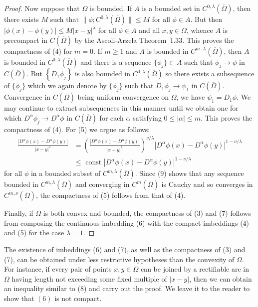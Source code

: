 \begin{proof}
  Now suppose that $\Omega$ is bounded. If $A$ is a bounded set in $C^{0, \lambda}(\overline{\Omega})$, 
  then there exists $M$ such that $\bigl\|\phi ; C^{0, \lambda}(\overline{\Omega})\bigr\| \leq M$
  for all $\phi \in A$. But then $|\phi(x)-\phi(y)| \leq M|x-y|^\lambda$ for all $\phi \in A$ and all $x, y \in \Omega$, whence $A$ is precompact in $C(\overline{\Omega})$ by the Ascoli-Arzela Theorem~1.33. This proves the compactness of (4) for $m=0$.
  If $m \geq 1$ and $A$ is bounded in $C^{m \cdot \lambda}(\overline{\Omega})$,
  then $A$ is bounded in $C^{0,\lambda}(\overline{\Omega})$ and
  there is a sequence $\{\phi_j\} \subset A$ such that $\phi_j \rightarrow \phi$
  in $C(\overline{\Omega})$. But $\left\{D_1 \phi_j\right\}$ is also bounded
  in $C^{0, \lambda}(\overline{\Omega})$ so there exists a subsequence
  of $\{\phi_j\}$ which we again denote by $\{\phi_j\}$ such that
  $D_1 \phi_j \rightarrow \psi_1$ in $C(\overline{\Omega})$.
  Convergence in $C(\overline{\Omega})$ being uniform convergence on $\Omega$,
  we have $\psi_1=D_1 \phi$. We may continue to extract subsequences in this manner until we 
  obtain one for which $D^\alpha \phi_j \rightarrow D^\alpha \phi$ in $C(\overline{\Omega})$ for 
  each $\alpha$ satisfying $0 \leq|\alpha| \leq m$. This proves the compactness of (4).
  For (5) we argue as follows:
  \[
  \begin{aligned}
  \frac{\left|D^\alpha \phi(x)-D^\alpha \phi(y)\right|}{|x-y|^\nu}
  & =\left(\frac{\left|D^\alpha \phi(x)-D^\alpha \phi(y)\right|}{|x-y|^\lambda}\right)^{\nu / \lambda}\left|D^\alpha \phi(x)-D^\alpha \phi(y)\right|^{1-\nu / \lambda} \\
  & \leq \text { const }\left|D^\alpha \phi(x)-D^\alpha \phi(y)\right|^{1-\nu / \lambda}
  \end{aligned}
  \]
  for all $\phi$ in a bounded subset of $C^{m, \lambda}(\overline{\Omega})$. Since (9) shows that any sequence bounded in $C^{m, \lambda}(\overline{\Omega})$ and converging in $C^m(\overline{\Omega})$ is Cauchy and so converges in $C^{m, \nu}(\overline{\Omega})$, the compactness of (5) follows from that of (4).

  Finally, if $\Omega$ is both convex and bounded, the compactness of (3) and (7) follows from composing the continuous imbedding (6) with the compact imbeddings (4) and (5) for the case $\lambda=1$.
\end{proof}


\begin{para}
  The existence of imbeddings (6) and (7), as well as the compactness of (3) and (7), can be obtained under less restrictive hypotheses than the convexity of $\Omega$. For instance, if every pair of points $x, y \in \Omega$ can be joined by a rectifiable arc in $\Omega$ having length not exceeding some fixed multiple of $|x-y|$, then we can obtain an inequality similar to (8) and carry out the proof. We leave it to the reader to show that $(6)$ is not compact.
\end{para}


